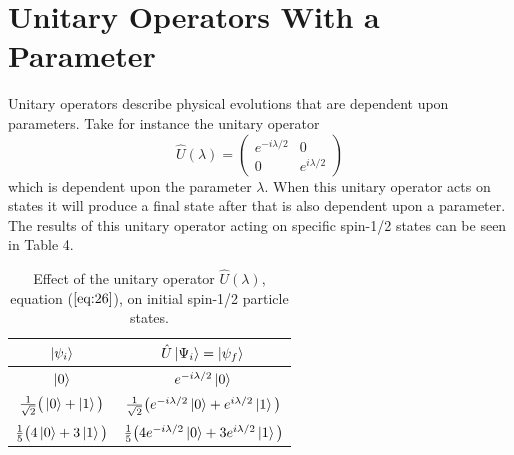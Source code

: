\documentclass[twocolumn]{article}
\begin{document}
\section*{Unitary Operators With a Parameter}
Unitary operators describe physical evolutions that are dependent upon parameters. Take for instance the unitary operator
\begin{equation}\label{eq:26}
\hat{U}(\lambda)=
\begin{pmatrix}
e^{-i\lambda/2} & 0 \\
0 & e^{i\lambda/2}
\end{pmatrix}
\end{equation}
which is dependent upon the parameter $\lambda$. When this unitary operator acts on states it will produce a final state after that is also dependent upon a parameter. The results of this unitary operator acting on specific spin-1/2 states can be seen in Table 4.
\newpage
\begin{table}[h!]
\begin{center}
\begin{tabular}{ |c|c| }
\hline $\ket{\psi_i}$& $\hat{U}\ket{\Psi_i}=\ket{\psi_f}$ \\
\hline $\ket{0}$& $e^{-i\lambda/2}\ket{0}$\\
\hline $\frac{1}{\sqrt{2}}\big(\ket{0}+\ket{1}\big)$& $\frac{1}{\sqrt{2}}\big(e^{-i\lambda/2}\ket{0}+e^{i\lambda/2}\ket{1}\big)$\\
\hline $\frac{1}{5}\big(4\ket{0}+3\ket{1}\big)$& $\frac{1}{5}\big(4e^{-i\lambda/2}\ket{0}+3e^{i\lambda/2}\ket{1}\big)$\\
\hline
\end{tabular}
\caption{Effect of the unitary operator $\hat{U}(\lambda)$, equation ($\ref{eq:26}$), on initial spin-1/2 particle states.}
\end{center}
\end{table} 
\end{document}

